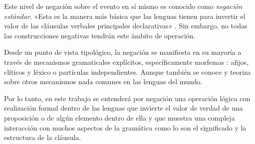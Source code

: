 Este nivel de negación sobre el evento en sí mismo es conocido como \textit{negación estándar}. «Esta es la manera más básica que las lenguas tienen para invertir el valor de las cláusulas verbales principales declarativas» \textcolor{MidnightBlue}{\citep{negStandar}}. Sin embargo, no todas las construcciones negativas tendrán este ámbito de operación.

Desde un punto de vista tipológico, la negación se manifiesta en su mayoría a través de mecanismos gramaticales explícitos, específicamente morfemas \textcolor{MidnightBlue}{\citep{morfemas}}: afijos, clíticos y léxico o partículas independientes. Aunque también se conoce y teoriza sobre otros mecanismos nada comunes en las lenguas del mundo.

Por lo tanto, en este trabajo se entenderá por negación una operación lógica con realización formal dentro de las lenguas que invierte el valor de verdad de una proposición o de algún elemento dentro de ella y que muestra una compleja interacción con muchos aspectos de la gramática como lo son el significado y la estructura de la cláusula.